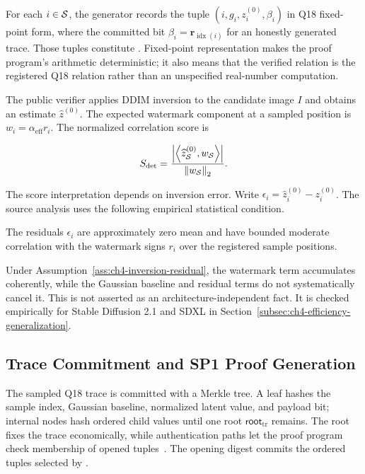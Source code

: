 For each $i\in\mathcal{S}$, the generator records the tuple
\((i,g_i,z_i^{(0)},\beta_i)\) in Q18 fixed-point form, where the committed bit
\(\beta_i=\mathbf r_{\operatorname{idx}(i)}\) for an honestly generated trace.
Those tuples constitute \PPTrace{}.  Fixed-point representation makes the proof
program's arithmetic deterministic; it also means that the verified relation is
the registered Q18 relation rather than an unspecified real-number computation.

The public verifier applies DDIM inversion to the candidate image $I$ and
obtains an estimate \(\widehat z^{(0)}\).  The expected watermark component at a
sampled position is $w_i=\alpha_{\mathrm{eff}}r_i$.  The normalized correlation
score is

\begin{equation}
    S_{\mathrm{det}}
        =\frac{
            \left|
                \left\langle
                    \widehat z^{(0)}_{\mathcal{S}},
                    w_{\mathcal{S}}
                \right\rangle
            \right|
        }{
            \left\lVert w_{\mathcal{S}}\right\rVert_2
        }.
\label{eq:ch4-detection-score}
\end{equation}

The score interpretation depends on inversion error.  Write
\(\epsilon_i=\widehat z_i^{(0)}-z_i^{(0)}\).  The source analysis uses the
following empirical statistical condition.

\begin{assumption}
\label{ass:ch4-inversion-residual}
The residuals \(\epsilon_i\) are approximately zero mean and have bounded moderate
correlation with the watermark signs $r_i$ over the registered sample positions.
\end{assumption}

Under Assumption~\ref{ass:ch4-inversion-residual}, the watermark term accumulates
coherently, while the Gaussian baseline and residual terms do not systematically
cancel it.  This is not asserted as an architecture-independent fact.  It is
checked empirically for Stable Diffusion 2.1 and SDXL in
Section~\ref{subsec:ch4-efficiency-generalization}.

\subsection{Trace Commitment and SP1 Proof Generation}
\label{subsec:ch4-trace-proof}

The sampled Q18 trace is committed with a Merkle tree.  A leaf hashes the sample
index, Gaussian baseline, normalized latent value, and payload bit; internal nodes
hash ordered child values until one root \(\mathsf{root}_{\mathrm{tr}}\) remains.
The root fixes the trace economically, while authentication paths let the proof
program check membership of opened tuples~\cite{merkle1988signature}.  The opening
digest commits the ordered tuples selected by \PPOpeningSet{}.

